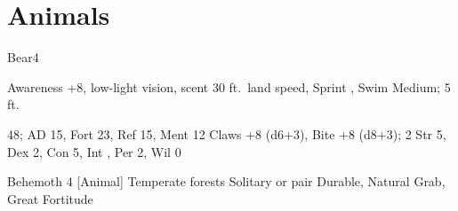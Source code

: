 \section{Animals}

    \begin{monsection}[Black]{Bear}{4}
        \begin{spellcontent}
            \begin{spelltargetinginfo}
                \pari {} Awareness +8, low-light vision, scent
                \pari {} 30 ft.\ land speed, Sprint , Swim 
                \pari {} Medium;  5 ft.
            \end{spelltargetinginfo}
            \begin{spelleffects}
                \pari {} 48;  AD 15, Fort 23, Ref 15, Ment 12
                \pari {} Claws +8 (d6+3), Bite +8 (d8+3);  2
                \pari {} Str 5, Dex 2, Con 5, Int , Per 2, Wil 0
            \end{spelleffects}
        \end{spellcontent}
        \begin{spellfooter}
            \pari {} Behemoth 4 [Animal]
            \pari {} Temperate forests
            \pari {} Solitary or pair
            \pari {} Durable, Natural Grab, Great Fortitude
        \end{spellfooter}
    \end{monsection}
